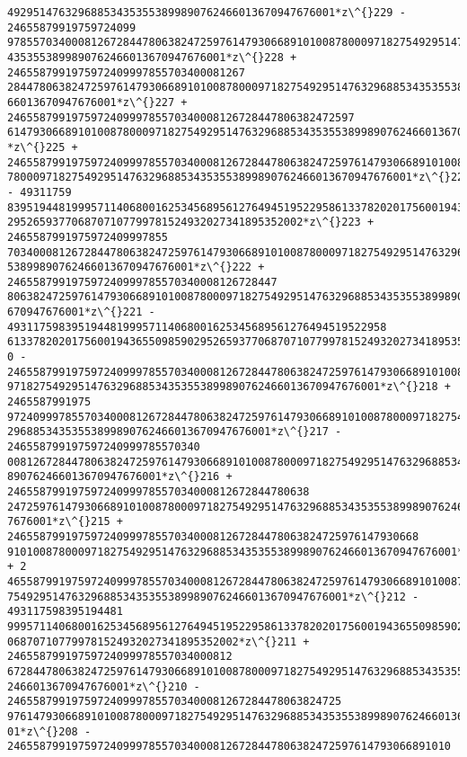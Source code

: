 \documentclass[11pt]{article}
\begin{document}
\begin{tcolorbox}[breakable, size=fbox, boxrule=.5pt, pad at break*=1mm, opacityfill=0]
\begin{Verbatim}[commandchars=\\\{\}]
492951476329688534353553899890762466013670947676001*z\^{}229 - 24655879919759724099
97855703400081267284478063824725976147930668910100878000971827549295147632968853
4353553899890762466013670947676001*z\^{}228 + 2465587991975972409997855703400081267
28447806382472597614793066891010087800097182754929514763296885343535538998907624
66013670947676001*z\^{}227 + 246558799197597240999785570340008126728447806382472597
61479306689101008780009718275492951476329688534353553899890762466013670947676001
*z\^{}225 + 24655879919759724099978557034000812672844780638247259761479306689101008
780009718275492951476329688534353553899890762466013670947676001*z\^{}224 - 49311759
83951944819995711406800162534568956127649451952295861337820201756001943655098590
2952659377068707107799781524932027341895352002*z\^{}223 + 2465587991975972409997855
70340008126728447806382472597614793066891010087800097182754929514763296885343535
53899890762466013670947676001*z\^{}222 + 246558799197597240999785570340008126728447
80638247259761479306689101008780009718275492951476329688534353553899890762466013
670947676001*z\^{}221 - 49311759839519448199957114068001625345689561276494519522958
613378202017560019436550985902952659377068707107799781524932027341895352002*z\^{}22
0 - 2465587991975972409997855703400081267284478063824725976147930668910100878000
9718275492951476329688534353553899890762466013670947676001*z\^{}218 + 2465587991975
97240999785570340008126728447806382472597614793066891010087800097182754929514763
29688534353553899890762466013670947676001*z\^{}217 - 246558799197597240999785570340
00812672844780638247259761479306689101008780009718275492951476329688534353553899
890762466013670947676001*z\^{}216 + 24655879919759724099978557034000812672844780638
24725976147930668910100878000971827549295147632968853435355389989076246601367094
7676001*z\^{}215 + 2465587991975972409997855703400081267284478063824725976147930668
9101008780009718275492951476329688534353553899890762466013670947676001*z\^{}213 + 2
46558799197597240999785570340008126728447806382472597614793066891010087800097182
75492951476329688534353553899890762466013670947676001*z\^{}212 - 493117598395194481
99957114068001625345689561276494519522958613378202017560019436550985902952659377
068707107799781524932027341895352002*z\^{}211 + 24655879919759724099978557034000812
67284478063824725976147930668910100878000971827549295147632968853435355389989076
2466013670947676001*z\^{}210 - 2465587991975972409997855703400081267284478063824725
97614793066891010087800097182754929514763296885343535538998907624660136709476760
01*z\^{}208 - 246558799197597240999785570340008126728447806382472597614793066891010

\end{Verbatim}
\end{tcolorbox}
\end{document}
